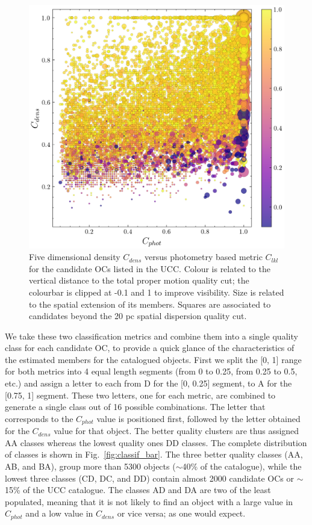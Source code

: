 \documentclass[fleqn,usenatbib]{mnras}
\begin{document}
\begin{figure}
	\includegraphics[width=\columnwidth]{figs/classif.png}
    \caption{Five dimensional density $C_{dens}$ versus photometry based metric
    $C_{lkl}$ for the candidate OCs listed in the UCC. Colour is related to the
    vertical distance to the total proper motion quality cut; the colourbar is
    clipped at -0.1 and 1 to improve visibility. Size is related to
    the spatial extension of its members. Squares are
    associated to candidates beyond the 20 pc spatial dispersion quality cut.}
    \label{fig:classification}
\end{figure}

We take these two classification metrics and combine them into a single quality
class for each candidate OC, to provide a quick glance of the characteristics of
the estimated members for the catalogued objects.
First we split the [0, 1] range for both metrics into 4 equal length segments 
(from 0 to 0.25, from 0.25 to 0.5, etc.) and assign a letter to each from D for
the [0, 0.25] segment, to A for the [0.75, 1] segment.
These two letters, one for each metric, are combined to generate a single class
out of 16 possible combinations. The letter that corresponds to the $C_{phot}$ 
value is positioned first, followed by the letter obtained for the $C_{dens}$
value for that object. The better quality clusters are thus assigned AA classes
whereas the lowest quality ones DD classes.
The complete distribution of classes is shown in Fig.~\ref{fig:classif_bar}.
The three better quality classes (AA, AB, and BA), group more than 5300
objects ($\sim$40\% of the catalogue), while the lowest three classes (CD,
DC, and DD) contain almost 2000 candidate OCs or $\sim$15\% of the UCC
catalogue. The classes AD and DA are two of the least populated, meaning that it
is not likely to find an object with a large value in $C_{phot}$ and a low value
in $C_{dens}$ or vice versa; as one would expect.
\end{document}
